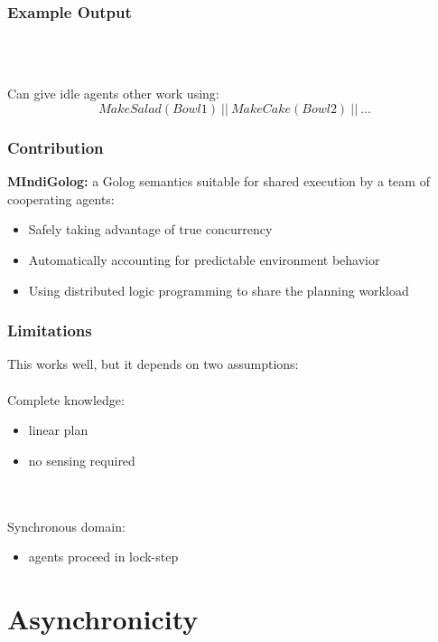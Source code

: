 \documentclass{beamer}
\begin{document}
\begin{frame}
\frametitle{Example Output}
\begin{columns}
  \begin{column}{0.5\textwidth}
  \end{column}
  \begin{column}{0.5\textwidth}
  \end{column}
\end{columns}
\ \\
\ \\
\pause
Can give idle agents other work using:\[
MakeSalad(Bowl1)\ ||\ MakeCake(Bowl2)\ ||\ \dots\]
\end{frame}

\begin{frame}
\frametitle{Contribution}
\textbf{MIndiGolog:} a Golog semantics suitable for shared execution by a team 
of cooperating agents:
\begin{itemize}
\item Safely taking advantage of true concurrency
\item Automatically accounting for predictable environment behavior
\item Using distributed logic programming to share the planning workload
\end{itemize}
\end{frame}

\begin{frame}
\frametitle{Limitations}
This works well, but it depends on two assumptions:
\ \\
\ \\
\pause
Complete knowledge:
\begin{itemize}
\item linear plan
\item no sensing required
\end{itemize}
\ \\
\ \\
\pause
Synchronous domain:
\begin{itemize}
\item agents proceed in lock-step
\end{itemize}
\end{frame}

\section{Asynchronicity}
\end{document}
